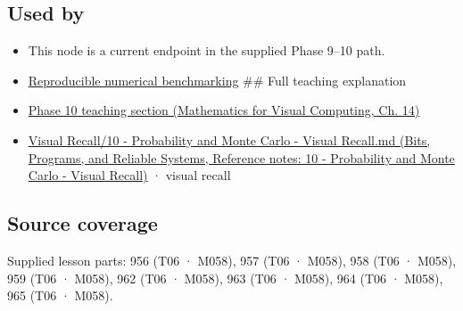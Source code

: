 \subsection{Used by}\label{appendix-bcc44e9d3d02-used-by}

\begin{itemize}
\item
  This node is a current endpoint in the supplied Phase 9--10 path.
\item
  \hyperref[appendix-b9db93e28371]{Reproducible numerical benchmarking} \#\# Full teaching explanation
\item
  \href{../02-Mathematics-for-Visual-Computing/main.pdf\#nameddest=02-foundations-ii-ch030-inference-and-error-metrics-need-explicit-assumptions}{Phase 10 teaching section (Mathematics for Visual Computing, Ch. 14)}
\item
  \href{../01-Bits-Programs-and-Reliable-Systems/main.pdf\#nameddest=appendix-cb5af353ef77}{Visual Recall/10 - Probability and Monte Carlo - Visual Recall.md (Bits, Programs, and Reliable Systems, Reference notes: 10 - Probability and Monte Carlo - Visual Recall)} · visual recall
\end{itemize}

\subsection{Source coverage}\label{appendix-bcc44e9d3d02-source-coverage}

Supplied lesson parts: 956 (T06 · M058), 957 (T06 · M058), 958 (T06 · M058), 959 (T06 · M058), 962 (T06 · M058), 963 (T06 · M058), 964 (T06 · M058), 965 (T06 · M058).

